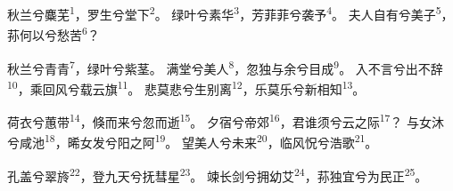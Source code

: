 
\begin{poem}
秋兰兮麋芜\textsuperscript{1}，罗生兮堂下\textsuperscript{2}。
绿叶兮素华\textsuperscript{3}，芳菲菲兮袭予\textsuperscript{4}。
夫人自有兮美子\textsuperscript{5}，荪何以兮愁苦\textsuperscript{6}？

秋兰兮青青\textsuperscript{7}，绿叶兮紫茎。
满堂兮美人\textsuperscript{8}，忽独与余兮目成\textsuperscript{9}。
入不言兮出不辞\textsuperscript{10}，乘回风兮载云旗\textsuperscript{11}。
悲莫悲兮生别离\textsuperscript{12}，乐莫乐兮新相知\textsuperscript{13}。

荷衣兮蕙带\textsuperscript{14}，倏而来兮忽而逝\textsuperscript{15}。
夕宿兮帝郊\textsuperscript{16}，君谁须兮云之际\textsuperscript{17}？
与女沐兮咸池\textsuperscript{18}，晞女发兮阳之阿\textsuperscript{19}。
望美人兮未来\textsuperscript{20}，临风怳兮浩歌\textsuperscript{21}。

孔盖兮翠旍\textsuperscript{22}，登九天兮抚彗星\textsuperscript{23}。
竦长剑兮拥幼艾\textsuperscript{24}，荪独宜兮为民正\textsuperscript{25}。
\end{poem}

